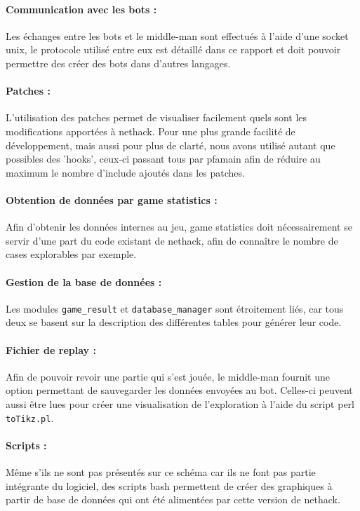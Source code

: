 \documentclass[a4paper,12pt]{article}
\begin{document}
\paragraph{Communication avec les bots :}
Les échanges entre les bots et le middle-man sont effectués à l'aide d'une
socket unix, le protocole utilisé entre eux est détaillé dans ce rapport et doit
pouvoir permettre des créer des bots dans d'autres langages.


\paragraph{Patches :}
L'utilisation des patches permet de visualiser facilement quels sont les
modifications apportées à nethack. Pour une plus grande facilité de
développement, mais aussi pour plus de clarté, nous avons utilisé autant que
possibles des 'hooks', ceux-ci passant tous par pfamain afin de réduire au
maximum le nombre d'include ajoutés dans les patches.

\paragraph{Obtention de données par game statistics :}
Afin d'obtenir les données internes au jeu, game statistics doit nécessairement
se servir d'une part du code existant de nethack, afin de connaître le nombre de
cases explorables par exemple.

\paragraph{Gestion de la base de données :}
Les modules {\verb|game_result|} et {\verb|database_manager|} sont étroitement
liés, car tous deux se basent sur la description des différentes tables pour
générer leur code.

\paragraph{Fichier de replay :}
Afin de pouvoir revoir une partie qui s'est jouée, le middle-man fournit une
option permettant de sauvegarder les données envoyées au bot. Celles-ci peuvent
aussi être lues pour créer une visualisation de l'exploration à l'aide du script
perl {\verb|toTikz.pl|}.%

\paragraph{Scripts :}
Même s'ils ne sont pas présentés sur ce schéma car ils ne font pas partie
intégrante du logiciel, des scripts bash permettent de créer des graphiques à
partir de base de données qui ont été alimentées par cette version de nethack.
\end{document}
